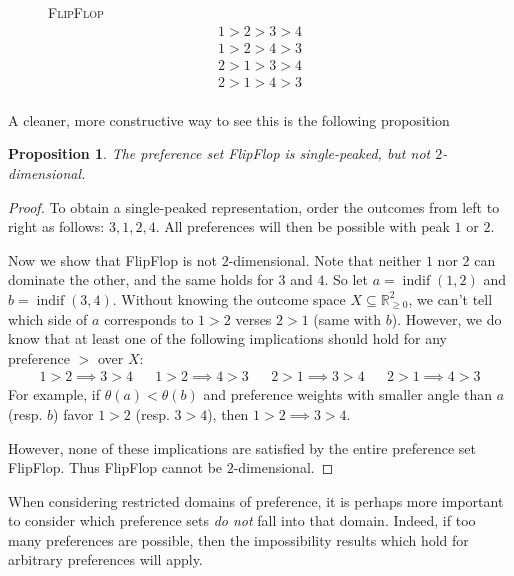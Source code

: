 \documentclass[12pt]{article}
\newtheorem{proposition}[theorem]{Proposition}
\newcommand{\Rgz}{\mathbb{R}_{\ge 0}}
\DeclareMathOperator*{\indif}{indif}
\newcommand{\1}[1]{\mathds{1}[{#1}]}
\begin{document}
  \begin{figure}
    \centering
    {\textsc{FlipFlop}}
    \begin{align*}
      1 > 2 > 3 > 4 \\
      1 > 2 > 4 > 3 \\
      2 > 1 > 3 > 4 \\
      2 > 1 > 4 > 3 \\
    \end{align*}
    \vspace{-1in}
  \end{figure}

  A cleaner, more constructive way to see this is the following proposition
  \begin{proposition}
    The preference set {\sc FlipFlop} is single-peaked, but not
    $2$-dimensional.
  \end{proposition}
  \begin{proof}
    To obtain a single-peaked representation, order the outcomes
    from left to right as follows: $3,1,2,4$.
    All preferences will then be possible with peak $1$ or $2$.

    Now we show that {\sc FlipFlop} is not $2$-dimensional.
    Note that neither $1$ nor $2$ can dominate the other,
    and the same holds for $3$ and $4$.
    So let $a=\indif(1,2)$ and $b=\indif(3,4)$.
    Without knowing the outcome space $X\subseteq \Rgz^2$,
    we can't tell which side of $a$ corresponds to $1 > 2$
    verses $2 > 1$ (same with $b$).
    However, we do know that at least one of the following implications should
    hold for any preference $>$ over $X$:
    \begin{align*}
      1 > 2 \implies 3 > 4
      && 1 > 2 \implies 4 > 3 &&
      2 > 1 \implies 3 > 4
      && 2 > 1 \implies 4 > 3
    \end{align*}
    For example, if $\theta(a) < \theta(b)$ and preference weights with smaller
    angle than $a$ (resp. $b$) favor $1 > 2$ (resp. $3 > 4$),
    then $1 > 2 \implies 3 > 4$.

    However, none of these implications are satisfied by the entire preference
    set {\sc FlipFlop}. Thus {\sc FlipFlop} cannot be $2$-dimensional.
  \end{proof}

  When considering restricted domains of preference, it is perhaps more
  important to consider which preference sets \emph{do not} fall into that
  domain. Indeed, if too many preferences are possible, then the impossibility
  results which hold for arbitrary preferences will apply.
\end{document}
